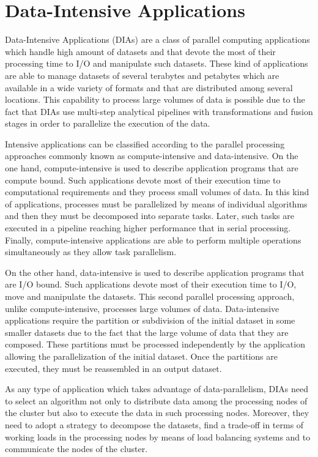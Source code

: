
\section{Data-Intensive Applications}

Data-Intensive Applications (DIAs) are a class of parallel computing applications which handle high amount of datasets and that devote the most of their processing time to I/O and manipulate such datasets. These kind of applications are able to manage datasets of several terabytes and petabytes which are available in a wide variety of formats and that are distributed among several locations. This capability to process large volumes of data is possible due to the fact that DIAs use multi-step analytical pipelines with transformations and fusion stages in order to parallelize the execution of the data.

Intensive applications can be classified according to the parallel processing approaches commonly known as compute-intensive and data-intensive. On the one hand, compute-intensive is used to describe application programs that are compute bound. Such applications devote most of their execution time to computational requirements and they process small volumes of data. In this kind of applications, processes must be parallelized by means of individual algorithms and then they must be decomposed into separate tasks. Later, such tasks are executed in a pipeline reaching higher performance that in serial processing. Finally, compute-intensive applications are able to perform multiple operations simultaneously as they allow task parallelism.

On the other hand, data-intensive is used to describe application programs that are I/O bound. Such applications devote most of their execution time to I/O, move and manipulate the datasets. This second parallel processing approach, unlike compute-intensive, processes large volumes of data. Data-intensive applications require the partition or subdivision of the initial dataset in some smaller datasets due to the fact that the large volume of data that they are composed. These partitions must be processed independently by the application allowing the parallelization of the initial dataset. Once the partitions are executed, they must be reassembled in an output dataset.

As any type of application which takes advantage of data-parallelism, DIAs need to select an algorithm not only to distribute data among the processing nodes of the cluster but also to execute the data in such processing nodes. Moreover, they need to adopt a strategy to decompose the datasets, find a trade-off in terms of working loads in the processing nodes by means of load balancing systems and to communicate the nodes of the cluster.

